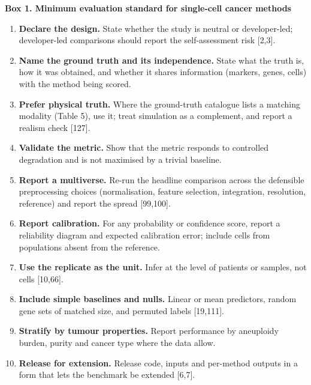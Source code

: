 \documentclass[11pt]{article}
\providecommand{\tightlist}{\setlength{\itemsep}{0pt}\setlength{\parskip}{0pt}}
\begin{document}
\begin{tcolorbox}[colback=gray!6,colframe=gray!60,boxrule=0.5pt,arc=1pt,left=6pt,right=6pt,top=4pt,bottom=4pt,breakable]
\textbf{Box 1. Minimum evaluation standard for single-cell cancer
methods}

\begin{enumerate}
\def\labelenumi{\arabic{enumi}.}
\tightlist
\item
  \textbf{Declare the design.} State whether the study is neutral or
  developer-led; developer-led comparisons should report the
  self-assessment risk {[}2,3{]}.
\item
  \textbf{Name the ground truth and its independence.} State what the
  truth is, how it was obtained, and whether it shares information
  (markers, genes, cells) with the method being scored.
\item
  \textbf{Prefer physical truth.} Where the ground-truth catalogue lists
  a matching modality (Table 5), use it; treat simulation as a
  complement, and report a realism check {[}127{]}.
\item
  \textbf{Validate the metric.} Show that the metric responds to
  controlled degradation and is not maximised by a trivial baseline.
\item
  \textbf{Report a multiverse.} Re-run the headline comparison across
  the defensible preprocessing choices (normalisation, feature
  selection, integration, resolution, reference) and report the spread
  {[}99,100{]}.
\item
  \textbf{Report calibration.} For any probability or confidence score,
  report a reliability diagram and expected calibration error; include
  cells from populations absent from the reference.
\item
  \textbf{Use the replicate as the unit.} Infer at the level of patients
  or samples, not cells {[}10,66{]}.
\item
  \textbf{Include simple baselines and nulls.} Linear or mean
  predictors, random gene sets of matched size, and permuted labels
  {[}19,111{]}.
\item
  \textbf{Stratify by tumour properties.} Report performance by
  aneuploidy burden, purity and cancer type where the data allow.
\item
  \textbf{Release for extension.} Release code, inputs and per-method
  outputs in a form that lets the benchmark be extended {[}6,7{]}.
\end{enumerate}
\end{tcolorbox}
\end{document}
